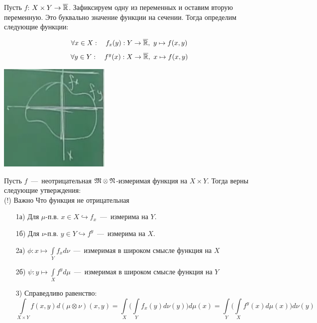 \begin{definition}
    Пусть $f$: $X \times Y \rightarrow \overline{\mathbb{R}}$. Зафиксируем одну из переменных и оставим вторую переменную. Это буквально значение функции на сечении. Тогда определим следующие функции: 

\begin{minipage}{0.5\textwidth}\raggedleft
    \[\forall x \in X:\quad f_x (y): Y \rightarrow \overline{\mathbb{R}}, \  y \mapsto f(x, y)\]
    \[\forall y \in Y: \quad f^y(x): X \rightarrow \overline{\mathbb{R}}, \ x \mapsto f(x, y)\]
\end{minipage}
    \begin{minipage}{0.5\textwidth}%
    \includegraphics[width=0.4\textwidth]{images/Slice.png}
\end{minipage}%
\hfill%
 

\end{definition}
\begin{theorem}[Тонелли]
    Пусть $f$~---~неотрицательная $\mathfrak{M}\otimes\mathfrak{N}$-измеримая функция на $X \times Y$. Тогда верны следующие утверждения:\\
    (!) Важно Что функция не отрицательная
    \begin{enumerate}
        \item[1а)] Для $\mu$-п.в. $x \in X \hookrightarrow f_x$~---~измерима на $Y$.  
        \item[1б)] Для $\nu$-п.в. $y \in Y \hookrightarrow f^y$~---~измерима на $X$.
        \item[2а)] $\phi: x \mapsto \int\limits_Y f_xd\nu$~---~измеримая в широком смысле функция на $X$
        \item[2б)] $\psi: y \mapsto \int\limits_X f^yd\mu$~---~измеримая в широком смысле функция на $Y$
        \item[3)] Справедливо равенство: \[\int\limits_{X \times Y}f(x, y)d(\mu\otimes\nu)(x, y) = \int\limits_X\biggl(\int\limits_Y f_x (y) d\nu (y) \biggr)d\mu(x) = \int\limits_Y\biggl(\int\limits_X f^y(x)d\mu(x)\biggr)d\nu(y)\]
    \end{enumerate}
\end{theorem}
